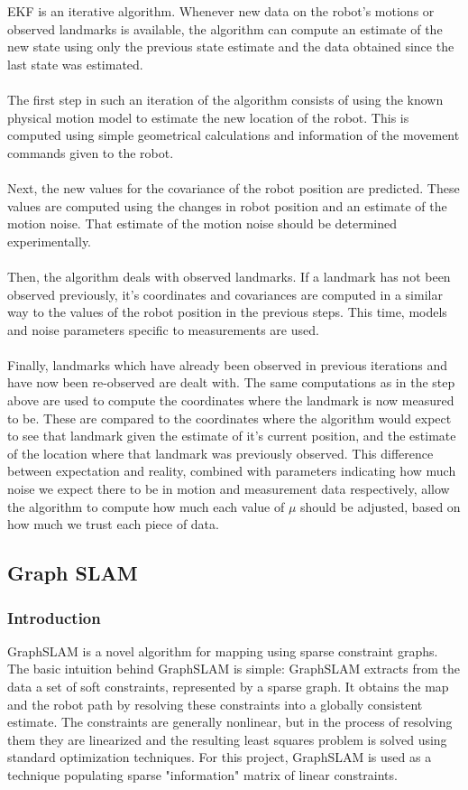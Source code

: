 \documentclass{ba-kecs}
\numberwithin{figure}{section}
\numberwithin{equation}{section}
\begin{document}
EKF is an iterative algorithm. Whenever new data on the robot’s motions or observed landmarks is available, the algorithm can compute an estimate of the new state using only the previous state estimate and the data obtained since the last state was estimated.\\\\
The first step in such an iteration of the algorithm consists of using the known physical motion model to estimate the new location of the robot. This is computed using simple geometrical calculations and information of the movement commands given to the robot.\\\\
Next, the new values for the covariance of the robot position are predicted. These values are computed using the changes in robot position and an estimate of the motion noise. That estimate of the motion noise should be determined experimentally.\\\\
Then, the algorithm deals with observed landmarks. If a landmark has not been observed previously, it’s coordinates and covariances are computed in a similar way to the values of the robot position in the previous steps. This time, models and noise parameters specific to measurements are used.\\\\
Finally, landmarks which have already been observed in previous iterations and have now been re-observed are dealt with. The same computations as in the step above are used to compute the coordinates where the landmark is now measured to be. These are compared to the coordinates where the algorithm would expect to see that landmark given the estimate of it’s current position, and the estimate of the location where that landmark was previously observed. This difference between expectation and reality, combined with parameters indicating how much noise we expect there to be in motion and measurement data respectively, allow the algorithm to compute how much each value of $\mu$ should be adjusted, based on how much we trust each piece of data.\\

\subsection{Graph SLAM}

\subsubsection{Introduction}
GraphSLAM is a novel algorithm for mapping using sparse constraint graphs. The basic intuition behind GraphSLAM is simple: GraphSLAM extracts from the data a set of soft constraints, represented by a sparse graph. It obtains the map and the robot path by resolving these constraints into a globally consistent estimate. The constraints are generally nonlinear, but in the process of resolving them they are linearized and the resulting least squares problem is solved using standard optimization techniques\cite{sik}. For this project, GraphSLAM is used as a technique populating sparse "information" matrix of linear constraints.
\end{document}
